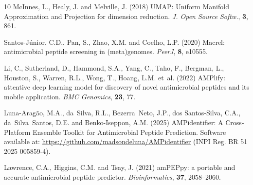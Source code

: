 \documentclass[unnumsec,webpdf,contemporary,large]{oup-authoring-template}%
\begin{document}
\begin{thebibliography}{10}
McInnes, L., Healy, J. and Melville, J. (2018)
UMAP: Uniform Manifold Approximation and Projection for dimension reduction.
\newblock \emph{J. Open Source Softw.}, \textbf{3}, 861.

Santos-J{\'u}nior, C.D., Pan, S., Zhao, X.M. and Coelho, L.P. (2020)
Macrel: antimicrobial peptide screening in (meta)genomes.
\newblock \emph{PeerJ}, \textbf{8}, e10555.

Li, C., Sutherland, D., Hammond, S.A., Yang, C., Taho, F., Bergman, L., Houston, S., Warren, R.L., Wong, T., Hoang, L.M. et~al. (2022)
AMPlify: attentive deep learning model for discovery of novel antimicrobial peptides and its mobile application.
\newblock \emph{BMC Genomics}, \textbf{23}, 77.

Luna-Arag{\~a}o, M.A., da~Silva, R.L., Bezerra~Neto, J.P., dos Santos-Silva, C.A., da~Silva~Santos, D.E. and Benko-Iseppon, A.M. (2025)
AMPidentifier: A Cross-Platform Ensemble Toolkit for Antimicrobial Peptide Prediction.
\newblock Software available at: \url{https://github.com/madsondeluna/AMPidentifier} (INPI Reg. BR 51 2025 005859-4).

Lawrence, C.A., Higgins, C.M. and Tsay, J. (2021)
amPEPpy: a portable and accurate antimicrobial peptide predictor.
\newblock \emph{Bioinformatics}, \textbf{37}, 2058--2060.

\end{thebibliography}
\end{document}
